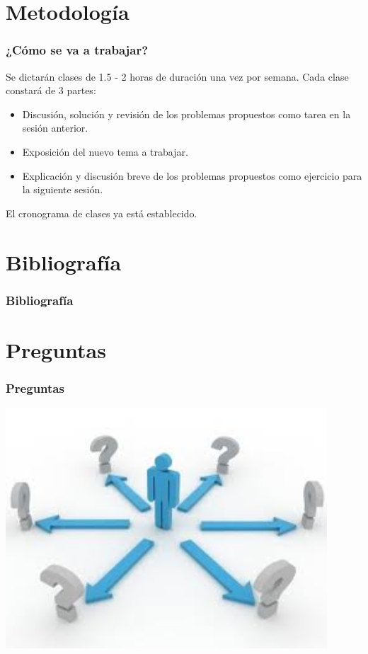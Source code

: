 \documentclass{beamer}
\begin{document}
\section{Metodología}
	\begin{frame}
		\frametitle{¿Cómo se va a trabajar?}
		Se dictarán clases de 1.5 - 2 horas de duración una vez por semana. Cada clase constará de 3 partes:
		\begin{itemize}
			\item{Discusión, solución y revisión de los problemas propuestos como tarea en la sesión anterior.}
			\item{Exposición del nuevo tema a trabajar.}
			\item{Explicación y discusión breve de los problemas propuestos como ejercicio para la siguiente sesión.}
		\end{itemize}
		El cronograma de clases ya está establecido.
	\end{frame}

\section{Bibliografía}
	\begin{frame}[allowframebreaks]
		\frametitle{Bibliografía}
		
		
	\end{frame}
	
\section{Preguntas}
	\begin{frame}
		\frametitle{Preguntas}
		\includegraphics[width = 0.9\textwidth]{preguntas.jpeg}
	\end{frame}
\end{document}
